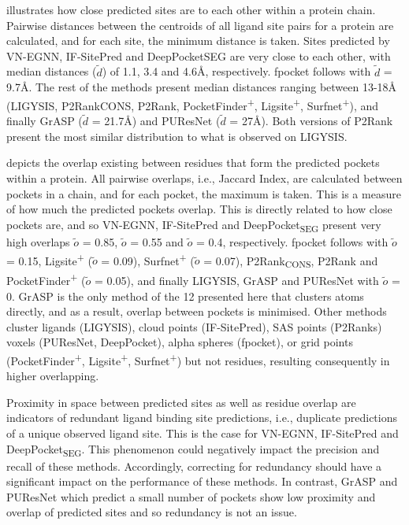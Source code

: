  illustrates how close predicted sites are to each other within a protein chain. Pairwise distances between the centroids of all ligand site pairs for a protein are calculated, and for each site, the minimum distance is taken. Sites predicted by VN-EGNN, IF-SitePred and DeepPocketSEG are very close to each other, with median distances ($\tilde{d}$) of 1.1, 3.4 and 4.6\AA{}, respectively. fpocket follows with $\tilde{d}$ = 9.7\AA{}. The rest of the methods present median distances ranging between 13-18\AA{} (LIGYSIS, P2RankCONS, P2Rank, PocketFinder\textsuperscript{+}, Ligsite\textsuperscript{+}, Surfnet\textsuperscript{+}), and finally GrASP ($\tilde{d}$ = 21.7\AA{}) and PUResNet ($\tilde{d}$ = 27\AA{}). Both versions of P2Rank present the most similar distribution to what is observed on LIGYSIS.

 depicts the overlap existing between residues that form the predicted pockets within a protein. All pairwise overlaps, i.e., Jaccard Index, are calculated between pockets in a chain, and for each pocket, the maximum is taken. This is a measure of how much the predicted pockets overlap. This is directly related to how close pockets are, and so VN-EGNN, IF-SitePred and DeepPocket\textsubscript{SEG} present very high overlaps $\tilde{o}$ = 0.85, $\tilde{o}$ = 0.55 and $\tilde{o}$ = 0.4, respectively. fpocket follows with $\tilde{o}$ = 0.15, Ligsite\textsuperscript{+} ($\tilde{o}$ = 0.09), Surfnet\textsuperscript{+} ($\tilde{o}$ = 0.07), P2Rank\textsubscript{CONS}, P2Rank and PocketFinder\textsuperscript{+} ($\tilde{o}$ = 0.05), and finally LIGYSIS, GrASP and PUResNet with $\tilde{o}$ = 0. GrASP is the only method of the 12 presented here that clusters atoms directly, and as a result, overlap between pockets is minimised. Other methods cluster ligands (LIGYSIS), cloud points (IF-SitePred), SAS points (P2Ranks) voxels (PUResNet, DeepPocket), alpha spheres (fpocket), or grid points (PocketFinder\textsuperscript{+}, Ligsite\textsuperscript{+}, Surfnet\textsuperscript{+}) but not residues, resulting consequently in higher overlapping.

Proximity in space between predicted sites as well as residue overlap are indicators of redundant ligand binding site predictions, i.e., duplicate predictions of a unique observed ligand site. This is the case for VN-EGNN, IF-SitePred and DeepPocket\textsubscript{SEG}. This phenomenon could negatively impact the precision and recall of these methods. Accordingly, correcting for redundancy should have a significant impact on the performance of these methods. In contrast, GrASP and PUResNet which predict a small number of pockets show low proximity and overlap of predicted sites and so redundancy is not an issue.

